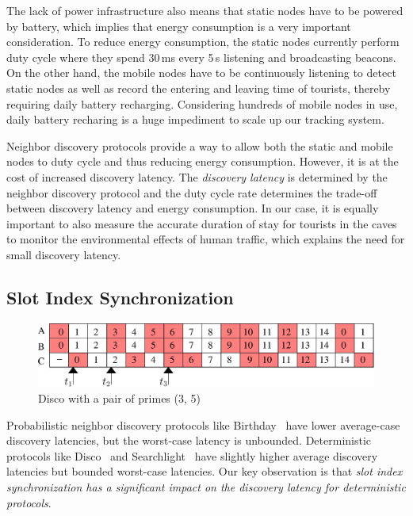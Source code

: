 \documentclass[twoside,twocolumn]{article}
\begin{document}
The lack of power infrastructure also means that static nodes have to
be powered by battery, which implies that energy consumption is a very
important consideration. To reduce energy consumption, the static
nodes currently perform duty cycle where they spend 30\,ms every 5\,s
listening and broadcasting beacons.  On the other hand, the mobile
nodes have to be continuously listening to detect static nodes as well
as record the entering and leaving time of tourists, thereby requiring
daily battery recharging. Considering hundreds of mobile nodes in use,
daily battery recharing is a huge impediment to scale up our tracking
system.

Neighbor discovery protocols provide a way to allow both the static and 
mobile nodes to duty cycle and thus reducing energy consumption. However, 
it is at the cost of increased discovery latency. The {\em discovery latency} 
is determined by the neighbor discovery protocol and the duty cycle rate 
determines the trade-off between discovery latency and energy consumption. 
In our case, it is equally important to also measure the accurate duration 
of stay for tourists in the caves to monitor the environmental effects of 
human traffic, which explains the need for small discovery latency.

\subsection{Slot Index Synchronization}

\begin{figure}[t]
   \centering
   \includegraphics[width=.9\columnwidth]{figs/disco_example}
   \caption{Disco with a pair of primes (3, 5)} 
   \label{fig:disco_example}
\end{figure}

Probabilistic neighbor discovery protocols like Birthday~\citep{mcglynn2001birthday} 
have lower average-case discovery latencies, but the worst-case latency 
is unbounded. Deterministic protocols like Disco~\citep{Dutta2008Practical} 
and Searchlight~\citep{bakht2012searchlight} have slightly higher average 
discovery latencies but bounded worst-case latencies. Our key observation 
is that {\em slot index synchronization has a significant impact on the 
discovery latency for deterministic protocols}.
\end{document}
